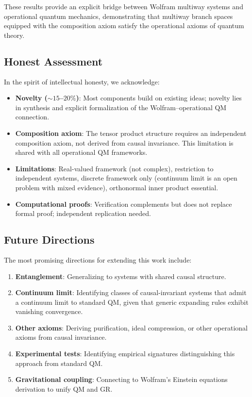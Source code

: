 \documentclass[11pt,a4paper]{article}
\theoremstyle{definition}
\theoremstyle{remark}
\begin{document}
These results provide an explicit bridge between Wolfram multiway systems and operational quantum mechanics, demonstrating that multiway branch spaces equipped with the composition axiom satisfy the operational axioms of quantum theory.

\subsection{Honest Assessment}

In the spirit of intellectual honesty, we acknowledge:
\begin{itemize}
\item \textbf{Novelty ($\sim 15$--$20\%$)}: Most components build on existing ideas; novelty lies in synthesis and explicit formalization of the Wolfram--operational QM connection.
\item \textbf{Composition axiom}: The tensor product structure requires an independent composition axiom, not derived from causal invariance. This limitation is shared with all operational QM frameworks.
\item \textbf{Limitations}: Real-valued framework (not complex), restriction to independent systems, discrete framework only (continuum limit is an open problem with mixed evidence), orthonormal inner product essential.
\item \textbf{Computational proofs}: Verification complements but does not replace formal proof; independent replication needed.
\end{itemize}

\subsection{Future Directions}

The most promising directions for extending this work include:
\begin{enumerate}
\item \textbf{Entanglement}: Generalizing to systems with shared causal structure.
\item \textbf{Continuum limit}: Identifying classes of causal-invariant systems that admit a continuum limit to standard QM, given that generic expanding rules exhibit vanishing convergence.
\item \textbf{Other axioms}: Deriving purification, ideal compression, or other operational axioms from causal invariance.
\item \textbf{Experimental tests}: Identifying empirical signatures distinguishing this approach from standard QM.
\item \textbf{Gravitational coupling}: Connecting to Wolfram's Einstein equations derivation to unify QM and GR.
\end{enumerate}
\end{document}
